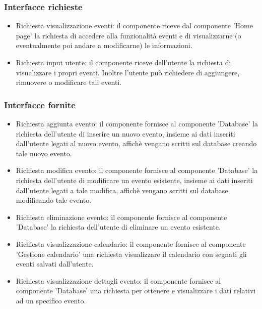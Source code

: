 \documentclass[a4paper,12pt]{article}
\begin{document}
\subsubsection*{Interfacce richieste}
\begin{itemize} \setlength\itemsep{0.01em}
\item {\sffamily Richiesta visualizzazione eventi}: il componente riceve dal componente 'Home page'  la richiesta di accedere alla funzionalità eventi e di visualizzarne (o eventualmente poi andare a modificarne) le informazioni.
\item {\sffamily Richiesta input utente}: il componente riceve dell'utente la richiesta di visualizzare i propri eventi. Inoltre l'utente può richiedere di aggiungere, rimuovere o modificare tali eventi.

\end{itemize}

\subsubsection*{Interfacce fornite}
\begin{itemize} \setlength\itemsep{0.01em}
\item {\sffamily Richiesta aggiunta evento}: il componente fornisce al componente 'Database' la richiesta dell'utente di inserire un nuovo evento, insieme ai dati inseriti dall'utente legati al nuovo evento, affichè vengano scritti sul database creando tale nuovo evento.
\item {\sffamily Richiesta modifica evento}: il componente fornisce al componente 'Database'  la richiesta dell'utente di modificare un evento esistente, insieme ai dati inseriti dall'utente legati a tale modifica, affichè vengano scritti sul database modificando tale evento.
\item {\sffamily Richiesta eliminazione evento}: il componente fornisce al componente 'Database'  la richiesta dell'utente di eliminare un evento esistente.
\item {\sffamily Richiesta visualizzazione calendario}: il componente fornisce al componente 'Gestione calendario' una richiesta visualizzare il calendario con segnati gli eventi salvati dall'utente.
\item {\sffamily Richiesta visualizzazione dettagli evento}: il componente fornisce al componente 'Database' una richiesta per ottenere e visualizzare i dati relativi ad un specifico evento.
\end{itemize}
\end{document}
